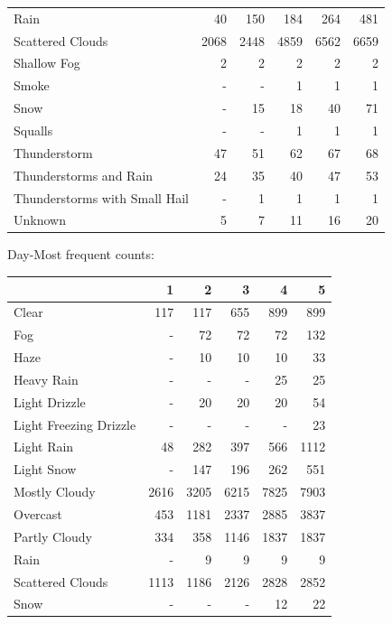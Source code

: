 \documentclass[11pt]{scrartcl}
\begin{document}
\begin{tabular}{lrrrrr}
Rain                          &    40 &   150 &   184 &    264 &    481 \\
Scattered Clouds              &  2068 &  2448 &  4859 &   6562 &   6659 \\
Shallow Fog                   &     2 &     2 &     2 &      2 &      2 \\
Smoke                         &   - &   - &     1 &      1 &      1 \\
Snow                          &   - &    15 &    18 &     40 &     71 \\
Squalls                       &   - &   - &     1 &      1 &      1 \\
Thunderstorm                  &    47 &    51 &    62 &     67 &     68 \\
Thunderstorms and Rain        &    24 &    35 &    40 &     47 &     53 \\
Thunderstorms with Small Hail &   - &     1 &     1 &      1 &      1 \\
Unknown                       &     5 &     7 &    11 &     16 &     20 \\
\bottomrule
\end{tabular}


Day-Most frequent counts:
\begin{tabular}{lrrrrr}
\toprule
{} &     1 &     2 &     3 &     4 &     5 \\
\midrule
Clear                  &   117 &   117 &   655 &   899 &   899 \\
Fog                    &   - &    72 &    72 &    72 &   132 \\
Haze                   &   - &    10 &    10 &    10 &    33 \\
Heavy Rain             &   - &   - &   - &    25 &    25 \\
Light Drizzle          &   - &    20 &    20 &    20 &    54 \\
Light Freezing Drizzle &   - &   - &   - &   - &    23 \\
Light Rain             &    48 &   282 &   397 &   566 &  1112 \\
Light Snow             &   - &   147 &   196 &   262 &   551 \\
Mostly Cloudy          &  2616 &  3205 &  6215 &  7825 &  7903 \\
Overcast               &   453 &  1181 &  2337 &  2885 &  3837 \\
Partly Cloudy          &   334 &   358 &  1146 &  1837 &  1837 \\
Rain                   &   - &     9 &     9 &     9 &     9 \\
Scattered Clouds       &  1113 &  1186 &  2126 &  2828 &  2852 \\
Snow                   &   - &   - &   - &    12 &    22 \\
\bottomrule
\end{tabular}
\end{document}
